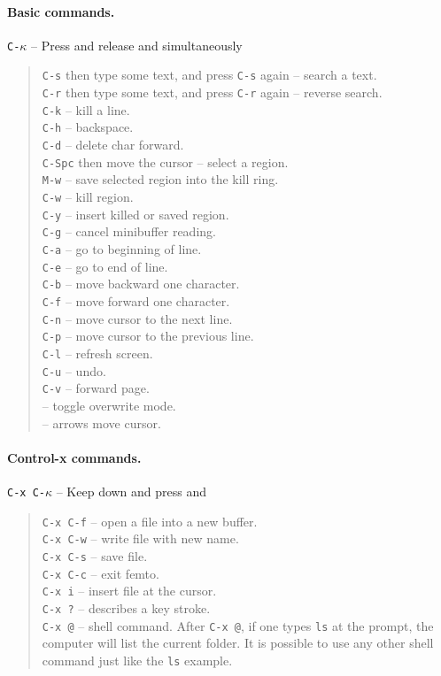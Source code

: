 \documentclass[a4paper,12pt]{book}
\begin{document}
\paragraph{Basic commands.} \verb|C-|$\kappa$ -- Press and release 
and \keys{$\kappa$} simultaneously
\begin{quote}
 \verb|C-s| then type some text, and press \verb|C-s| again 
  -- search a text.\\
 \verb|C-r| then type some text, and press \verb|C-r| again 
  -- reverse search.\\
 \verb|C-k| -- kill a line.\\
 \verb|C-h| -- backspace.\\
 \verb|C-d| -- delete char forward.\\ 
 \verb|C-Spc| then move the cursor -- select a region.\\
 \verb|M-w| -- save selected region into the kill ring. \\
 \verb|C-w| -- kill region.\\
 \verb|C-y| -- insert killed or saved region.\\
 \verb|C-g| -- cancel minibuffer reading.\\
 \verb|C-a| -- go to beginning of line.\\
 \verb|C-e| -- go to end of line.\\
 \verb|C-b| -- move backward one character.\\
 \verb|C-f| -- move forward one character.\\
 \verb|C-n| -- move cursor to the next line.\\
 \verb|C-p| -- move cursor to the previous line.\\
 \verb|C-l| -- refresh screen.\\
 \verb|C-u| -- undo. \\
 \verb|C-v| -- forward page.\\
  -- toggle overwrite mode.\\
 \keys{$\leftarrow$} \keys{$\rightarrow$} \keys{$\uparrow$} \keys{$\downarrow$} -- arrows move cursor.\\
\end{quote}
\paragraph{Control-x commands.} \verb|C-x C-|$\kappa$ -- Keep 
down and press  and  \keys{$\kappa$}
\begin{quote}
  \verb|C-x C-f| -- open a file into a new buffer.\\
  \verb|C-x C-w| -- write file with new name.\\
\verb|C-x C-s| -- save file.\\
\verb|C-x C-c| -- exit femto.\\
\verb|C-x i| -- insert file at the cursor.\\
\verb|C-x ?| -- describes a key stroke.\\
\verb|C-x @| --  shell command. After \verb|C-x @|,
if one types \verb|ls| at the prompt, the computer
will list the current folder.
It is possible to use any other shell command
just like the \verb|ls| example.
\end{quote}
\end{document}
